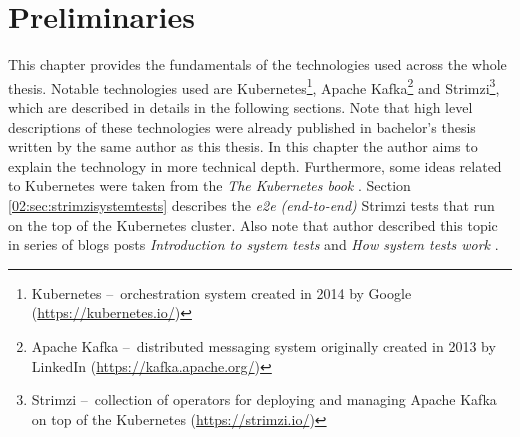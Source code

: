 \chapter{Preliminaries}

This chapter provides the fundamentals of the technologies used across the whole thesis.
Notable technologies used are Kubernetes\footnote{Kubernetes \---\ orchestration system created in 2014 by Google (\url{https://kubernetes.io/})}, Apache Kafka\footnote{Apache Kafka \---\ distributed messaging system originally created in 2013 by LinkedIn (\url{https://kafka.apache.org/})} and Strimzi\footnote{Strimzi \---\ collection of operators for deploying and managing Apache Kafka on top of the Kubernetes (\url{https://strimzi.io/})}, which are described in details in the following sections.
Note that high level descriptions of these technologies were already published in bachelor's thesis \cite{02-bachelor-thesis} written by the same author as this thesis.
In this chapter the author aims to explain the technology in more technical depth.
Furthermore, some ideas related to Kubernetes were taken from the \emph{The Kubernetes book} \cite{kubernetesBook}.
Section \ref{02:sec:strimzisystemtests} describes the \emph{e2e (end-to-end)}  Strimzi tests that run on the top of the Kubernetes cluster.
Also note that author described this topic in series of blogs posts \emph{Introduction to system tests} \cite{02-blogpost-introduction-to-systemtest} and \emph{How system tests work} \cite{02-blogpost-how-systemtest-work}.